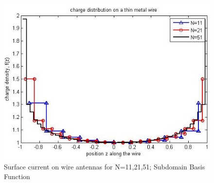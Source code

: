 \documentclass[aps,prstab,twocolumn,superscriptaddress,groupedaddress,showkeys,nofootinbib]{revtex4}  %
\begin{document}
\begin{figure}[here!]
\centering
\includegraphics[scale=0.5]{subd.jpg}
\caption{Surface current on wire antennas for N=11,21,51; Subdomain Basis Function }
\end{figure}
\end{document}
